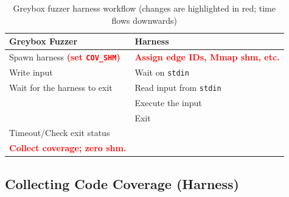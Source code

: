 \documentclass[letterpaper,11pt]{article}
\begin{document}
\begin{table}[ht]
\centering
\caption{Greybox fuzzer harness workflow (changes are highlighted in red; time flows downwards)}

\label{tab:greyboxfuzzerharness}
\begin{tabular}{ll}
\toprule
\textbf{Greybox Fuzzer}          & \textbf{Harness}       \\ \midrule
Spawn harness \textbf{\textcolor{red}{(set \texttt{COV_SHM})}}            &  \textbf{\textcolor{red}{Assign edge IDs, Mmap shm, etc.}}    \\
Write input               &  Wait on \texttt{stdin}   \\
Wait for the harness to exit          & Read input from \texttt{stdin}   \\
                    & Execute the input   \\
                     &  Exit                    \\
Timeout/Check exit status                      &                     \\
\textbf{\textcolor{red}{Collect coverage; zero shm.}}                     &                     \\
\bottomrule

\end{tabular}
\end{table}





\subsection{Collecting Code Coverage (Harness)}
\label{subsec:collectingcodecoverage}


\end{document}

